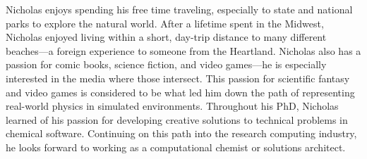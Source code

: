 Nicholas enjoys spending his free time traveling, especially to state and national parks to explore the natural world.
After a lifetime spent in the Midwest, Nicholas enjoyed living within a short, day-trip distance to many different beaches---a foreign experience to someone from the Heartland.
Nicholas also has a passion for comic books, science fiction, and video games---he is especially interested in the media where those intersect.
This passion for scientific fantasy and video games is considered to be what led him down the path of representing real-world physics in simulated environments.
Throughout his PhD, Nicholas learned of his passion for developing creative solutions to technical problems in chemical software. 
Continuing on this path into the research computing industry, he looks forward to working as a computational chemist or solutions architect.
